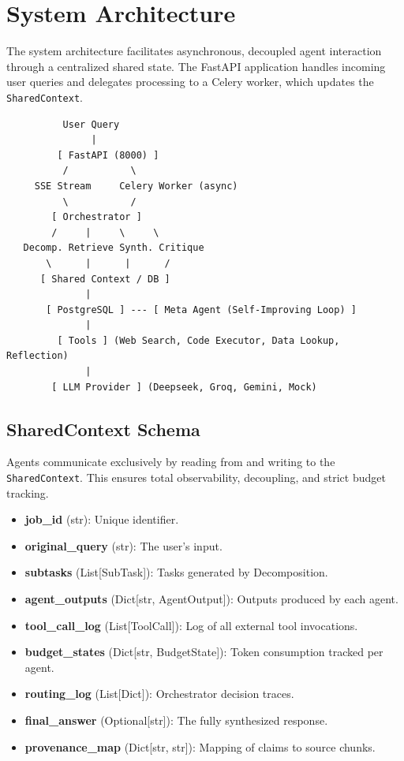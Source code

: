 \documentclass[11pt]{article}
\begin{document}
\section{System Architecture}

The system architecture facilitates asynchronous, decoupled agent interaction through a centralized shared state. The FastAPI application handles incoming user queries and delegates processing to a Celery worker, which updates the \texttt{SharedContext}. 

\begin{verbatim}
          User Query
               |
         [ FastAPI (8000) ] 
          /           \
     SSE Stream     Celery Worker (async)
          \           /
        [ Orchestrator ] 
        /     |     \     \
   Decomp. Retrieve Synth. Critique
       \      |      |      /
      [ Shared Context / DB ] 
              |
       [ PostgreSQL ] --- [ Meta Agent (Self-Improving Loop) ]
              |
         [ Tools ] (Web Search, Code Executor, Data Lookup, Reflection)
              |
        [ LLM Provider ] (Deepseek, Groq, Gemini, Mock)
\end{verbatim}

\subsection{SharedContext Schema}
Agents communicate exclusively by reading from and writing to the \texttt{SharedContext}. This ensures total observability, decoupling, and strict budget tracking.
\begin{itemize}
    \item \textbf{job\_id} (str): Unique identifier.
    \item \textbf{original\_query} (str): The user's input.
    \item \textbf{subtasks} (List[SubTask]): Tasks generated by Decomposition.
    \item \textbf{agent\_outputs} (Dict[str, AgentOutput]): Outputs produced by each agent.
    \item \textbf{tool\_call\_log} (List[ToolCall]): Log of all external tool invocations.
    \item \textbf{budget\_states} (Dict[str, BudgetState]): Token consumption tracked per agent.
    \item \textbf{routing\_log} (List[Dict]): Orchestrator decision traces.
    \item \textbf{final\_answer} (Optional[str]): The fully synthesized response.
    \item \textbf{provenance\_map} (Dict[str, str]): Mapping of claims to source chunks.
\end{itemize}
\end{document}
